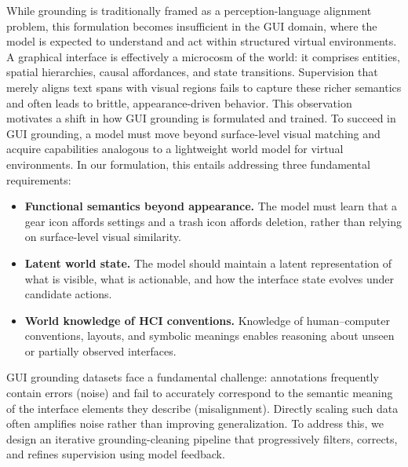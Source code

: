 While grounding is traditionally framed as a perception-language alignment problem, this formulation becomes insufficient in the GUI domain, where the model is expected to understand and act within structured virtual environments. A graphical interface is effectively a microcosm of the world: it comprises entities, spatial hierarchies, causal affordances, and state transitions. Supervision that merely aligns text spans with visual regions fails to capture these richer semantics and often leads to brittle, appearance-driven behavior. This observation motivates a shift in how GUI grounding is formulated and trained. To succeed in GUI grounding, a model must move beyond surface-level visual matching and acquire capabilities analogous to a lightweight world model for virtual environments. In our formulation, this entails addressing three fundamental requirements:
\begin{itemize}
    \item \textbf{Functional semantics beyond appearance.} The model must learn that a gear icon affords settings and a trash icon affords deletion, rather than relying on surface-level visual similarity.
    \item \textbf{Latent world state.} The model should maintain a latent representation of what is visible, what is actionable, and how the interface state evolves under candidate actions.
    \item \textbf{World knowledge of HCI conventions.} Knowledge of human--computer conventions, layouts, and symbolic meanings enables reasoning about unseen or partially observed interfaces.
\end{itemize}


GUI grounding datasets face a fundamental challenge: annotations frequently contain errors (noise) and fail to accurately correspond to the semantic meaning of the interface elements they describe (misalignment). Directly scaling such data often amplifies noise rather than improving generalization. To address this, we design an iterative grounding-cleaning pipeline that progressively filters, corrects, and refines supervision using model feedback.

